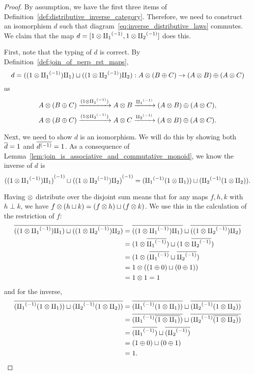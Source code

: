 \begin{proof}
  By assumption, we have the first three items of
  Definition~\ref{def:distributive_inverse_category}. Therefore, we need to construct an
  isomorphism $d$ such that diagram~\ref{eq:inverse_distributive_laws} commutes. We claim that the
  map $d = [1\otimes {\amalg_{1}}^{(-1)}, 1\otimes {\amalg_{2}}^{(-1)}]$ does this.

  First, note that the typing of $d$ is correct. By Definition~\ref{def:join_of_perp_rst_maps},
  \[
    d = ((1 \otimes {\amalg_{1}}^{(-1)}) \amalg_{1} )\sqcup ((1\otimes{\amalg_{2}}^{(-1)}) \amalg_{2}) : A \otimes (B \oplus C) \to (A\otimes B)\oplus(A\otimes C)
  \]
  as
  \begin{align*}
      A \otimes (B \oplus C) & \xrightarrow{(1\otimes{\amalg_{1}}^{(-1)})} A\otimes B \xrightarrow{{\amalg_{1}}^{(-1)}} (A\otimes B)\oplus(A\otimes C),\\
      A \otimes (B \oplus C) & \xrightarrow{(1\otimes{\amalg_{2}}^{(-1)})} A\otimes C \xrightarrow{{\amalg_{2}}^{(-1)}} (A\otimes B)\oplus(A\otimes C).
  \end{align*}

  Next, we need to show $d$ is an isomorphism. We will do this by showing both $\overline{d} = 1$ and
  $\overline{{d}^{(-1)}} = 1$.
  As a consequence of Lemma~\ref{lem:join_is_associative_and_commutative_monoid}, we know
  the inverse of $d$ is
  \[
    {((1 \otimes {\amalg_{1}}^{(-1)}) \amalg_{1} )}^{(-1)}\sqcup {((1\otimes\ensuremath{{\amalg_{2}}^{(-1)}}) \amalg_{2})}^{(-1)} =
      ( {\amalg_{1}}^{(-1)}(1 \otimes \amalg_{1}) ) \sqcup ( {\amalg_{2}}^{(-1)}(1\otimes\amalg_{2})).
  \]

  Having $\otimes$ distribute over the disjoint sum means that for any maps $f,h,k$ with $h\perp k$, we
  have $f \otimes (h\sqcup k) = (f\otimes h) \sqcup (f\otimes k)$. We use this in the calculation of the restriction
  of $f$:
  \begin{align*}
    \overline{((1 \otimes {\amalg_{1}}^{(-1)}) \amalg_{1} )\sqcup ((1\otimes{\amalg_{2}}^{(-1)}) \amalg_{2})}
      &= \overline{((1 \otimes {\amalg_{1}}^{(-1)}) \amalg_{1} )}\sqcup \overline{((1\otimes{\amalg_{2}}^{(-1)}) \amalg_{2})} \\
      &= (1\otimes \overline{{\amalg_{1}}^{(-1)}}) \sqcup (1\otimes \overline{{\amalg_{2}}^{(-1)}}) \\
      &= (1\otimes (\overline{{\amalg_{1}}^{(-1)}} \sqcup \overline{{\amalg_{2}}^{(-1)}}) \\
      &= 1\otimes ((1\oplus0) \sqcup (0\oplus1) )\\
      &=1 \otimes 1 = 1
  \end{align*}
  and for the inverse,
  \begin{align*}
    \overline{( {\amalg_{1}}^{(-1)}(1 \otimes \amalg_{1}) ) \sqcup ( {\amalg_{2}}^{(-1)}(1\otimes\amalg_{2}))}
      &= \overline{({\amalg_{1}}^{(-1)}(1 \otimes \amalg_{1}) )}\sqcup \overline{({\amalg_{2}}^{(-1)}(1\otimes\amalg_{2}))} \\
      &= \overline{({\amalg_{1}}^{(-1)}\overline{(1 \otimes \amalg_{1})} )}\sqcup \overline{({\amalg_{2}}^{(-1)}\overline{(1\otimes\amalg_{2})})} \\
      &= \overline{({\amalg_{1}}^{(-1)})}\sqcup \overline{({\amalg_{2}}^{(-1)})}\\
      &= (1\oplus0) \sqcup (0\oplus1) \\
      &= 1.
  \end{align*}


\end{proof}
